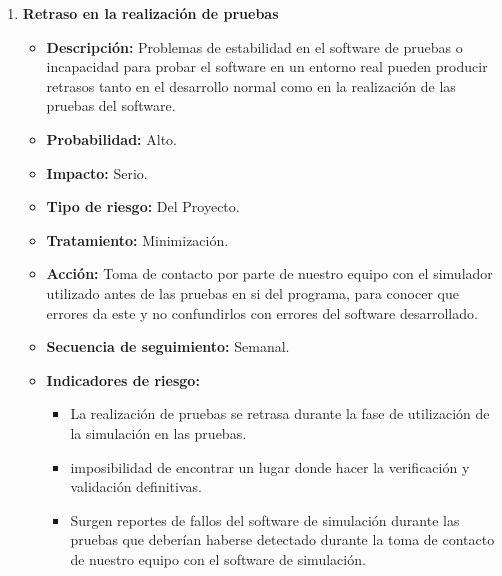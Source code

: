 \begin{enumerate}
    \item \textbf{Retraso en la realización de pruebas}

          \begin{itemize}
              \item \textbf{Descripción:} Problemas de estabilidad en el software de pruebas o incapacidad para probar el software en un entorno real pueden producir retrasos tanto en el desarrollo normal como en la realización de las pruebas del software.
              \item \textbf{Probabilidad:} Alto.
              \item \textbf{Impacto:} Serio.
              \item \textbf{Tipo de riesgo:} Del Proyecto.
              \item \textbf{Tratamiento:} Minimización.
              \item \textbf{Acción:} Toma de contacto por parte de nuestro equipo con el simulador utilizado antes de las pruebas en si del programa, para conocer que errores da este y no confundirlos con errores del software desarrollado.
              \item \textbf{Secuencia de seguimiento:} Semanal.
              \item \textbf{Indicadores de riesgo:}
                    \begin{itemize}
                        \item La realización de pruebas se retrasa durante la fase de utilización de la simulación en las pruebas.
                        \item imposibilidad de encontrar un lugar donde hacer la verificación y validación definitivas.
                        \item Surgen reportes de fallos del software de simulación durante las pruebas que deberían haberse detectado durante la toma de contacto de nuestro equipo con el software de simulación.
                    \end{itemize}
          \end{itemize}


\end{enumerate}
